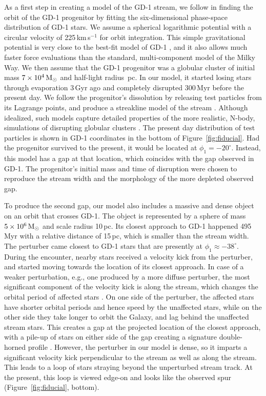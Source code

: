 \documentclass[twocolumn]{aastex62}
\begin{document}
As a first step in creating a model of the GD-1 stream, we follow \citet{pwb} in finding the orbit of the GD-1 progenitor by fitting the six-dimensional phase-space distribution of GD-1 stars.
We assume a spherical logarithmic potential with a circular velocity of 225\,km\,s$^{-1}$ for orbit integration.
This simple gravitational potential is very close to the best-fit model of GD-1 \citep{koposov2010, bowden2015}, and it also allows much faster force evaluations than the standard, multi-component model of the Milky Way.
We then assume that the GD-1 progenitor was a globular cluster of initial mass $7\times10^4\rm\,M_\odot$ and half-light radius \,pc.
In our model, it started losing stars through evaporation 3\,Gyr ago and completely disrupted 300\,Myr before the present day.
We follow the progenitor's dissolution by releasing test particles from its Lagrange points, and produce a streakline model of the stream \citep{fardal2015}.
Although idealized, such models capture detailed properties of the more realistic, N-body, simulations of disrupting globular clusters \citep{kupper2012}.
The present day distribution of test particles is shown in GD-1 coordinates in the bottom of Figure~\ref{fig:fiducial}.
Had the progenitor survived to the present, it would be located at $\phi_1=-20^\circ$.
Instead, this model has a gap at that location, which coincides with the gap observed in GD-1.
The progenitor's initial mass and time of disruption were chosen to reproduce the stream width and the morphology of the more depleted observed gap.

To produce the second gap, our model also includes a massive and dense object on an orbit that crosses GD-1.
The object is represented by a \citet{hernquist1990} sphere of mass $5\times10^6\rm\,M_\odot$ and scale radius 10\,pc.
Its closest approach to GD-1 happened 495\,Myr with a relative distance of 15\,pc, which is smaller than the stream width.
The perturber came closest to GD-1 stars that are presently at $\phi_1\approx-38^\circ$.
During the encounter, nearby stars received a velocity kick from the perturber, and started moving towards the location of its closest approach.
In case of a weaker perturbation, e.g., one produced by a more diffuse perturber, the most significant component of the velocity kick is along the stream, which changes the orbital period of affected stars \citep{eb2015}.
On one side of the perturber, the affected stars have shorter orbital periods and hence speed by the unaffected stars, while on the other side they take longer to orbit the Galaxy, and lag behind the unaffected stream stars.
This creates a gap at the projected location of the closest approach, with a pile-up of stars on either side of the gap creating a signature double-horned profile \citep{carlberg2012}.
However, the perturber in our model is dense, so it imparts a significant velocity kick perpendicular to the stream as well as along the stream.
This leads to a loop of stars straying beyond the unperturbed stream track.
At the present, this loop is viewed edge-on and looks like the observed spur (Figure~\ref{fig:fiducial}, bottom).
\end{document}
